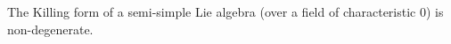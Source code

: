 The Killing form of a semi-simple Lie algebra (over a field of characteristic $0$) is non-degenerate.
